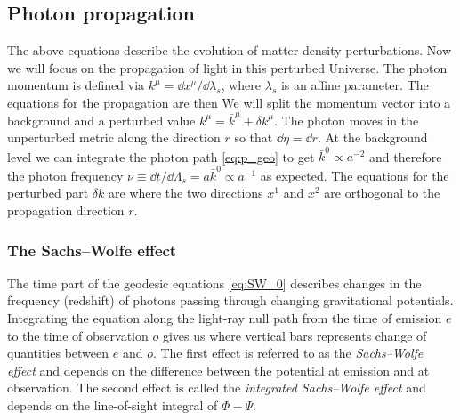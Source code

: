 \subsection{Photon propagation}
The above equations describe the evolution of matter density perturbations. Now we will focus on the propagation of light in this perturbed Universe. The photon momentum is defined via $k^\mu=\dd x^\mu/\dd\lambda_s$, where $\lambda_s$ is an affine parameter. The equations for the propagation are then
We will split the momentum vector into a background and a perturbed value $k^\mu=\bar k^\mu+\delta k^\mu$. The photon moves in the unperturbed metric along the direction $r$ so that $\dd\eta=\dd r$. At the background level we can integrate the photon path \eqref{eq:p_geo} to get $\bar k^0\propto a^{-2}$ and therefore the photon frequency $\nu\equiv\dd t/\dd\Lambda_s=a\bar k^0\propto a^{-1}$ as expected. The equations for the perturbed part $\delta k$ are \parencite[for details see e.g. ][]{2010deto.book.....A}
where the two directions $x^1$ and $x^2$ are orthogonal to the propagation direction $r$.
\subsubsection{The Sachs--Wolfe effect}
The time part of the geodesic equations \eqref{eq:SW_0} describes changes in the frequency (redshift) of photons passing through changing gravitational potentials. Integrating the equation along the light-ray null path from the time of emission $e$ to the time of observation $o$ gives us
where vertical bars represents change of quantities between $e$ and $o$. The first effect is referred to as the \textit{Sachs--Wolfe effect} and depends on the difference between the potential at emission and at observation. The second effect is called the \textit{integrated Sachs--Wolfe effect} and depends on the line-of-sight integral of $\Phi-\Psi$.
